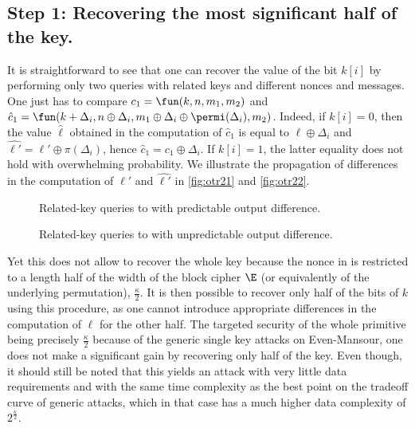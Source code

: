 \subsection{Step 1: Recovering the most significant half of the key.}

It is straightforward to see that one can recover the value
of the bit $k[i]$ by performing only two queries with related keys
and different nonces and messages. One just has to compare
$c_1 = \fun(k, n, m_1, m_2)$ and
$\hat{c}_1 = \fun(k + \Delta_i,n \oplus \Delta_i,
m_1 \oplus \Delta_i \oplus \permi(\Delta_i), m_2)$. Indeed, if $k[i] = 0$,
then the value $\hat{\ell}$ obtained in the computation of $\hat{c}_1$ is equal to
$\ell \oplus \Delta_i$ and $\hat{\ell'} = \ell' \oplus \pi(\Delta_i)$, hence
$\hat{c}_1 = c_1 \oplus \Delta_i$. If $k[i] = 1$, the latter equality does not
hold with overwhelming probability.
We illustrate the propagation of differences in the computation of $\ell'$ and $\hat{\ell'}$ in
\autoref{fig:otr21} and \autoref{fig:otr22}.


\begin{figure}[!htb]
\begin{center}

\caption{Related-key queries to \proestotr with predictable output difference.\label{fig:otr21}}
\end{center}
\end{figure}

\begin{figure}[!htb]
\begin{center}

\caption{Related-key queries to \proestotr with unpredictable output difference.\label{fig:otr22}}
\end{center}
\end{figure}

Yet this does not allow to recover the whole key because the nonce in \proestotr is restricted to a length
half of the width of the block cipher $\E$ (or equivalently of the underlying \proest permutation),
\ie $\frac{\kappa}{2}$. It is then possible to recover only
half of the bits of $k$ using this procedure, as one cannot introduce appropriate differences in
the computation of $\ell$ for the other half. The targeted security of the
whole primitive being precisely $\frac{\kappa}{2}$ because of the generic single key
attacks on Even-Mansour,
one does not make a significant gain by recovering only half of the key.
Even though, it should still be noted that this yields an
attack with very little data requirements and with the same time complexity as the best
point on the tradeoff curve of generic attacks, which in that case has a much higher data complexity of
$2^\frac{\kappa}{2}$.


